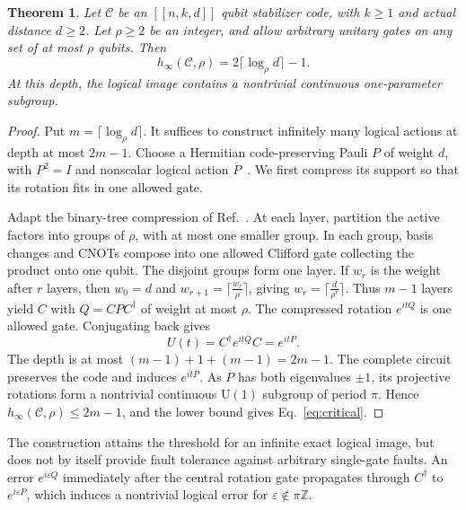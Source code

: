 \documentclass[aps,prl,reprint,notitlepage,nofootinbib,nobibnotes]{revtex4-2}
\newtheorem{theorem}{Theorem}
\newcommand{\id}{I}
\begin{document}
\begin{samepage}
\begin{theorem}\label{cor:critical}
Let \(\mathcal C\) be an \([[n,k,d]]\) qubit stabilizer code,
with \(k\ge1\) and actual distance \(d\ge2\). Let \(\rho\ge2\) be an
integer, and allow arbitrary unitary gates on any set of at most \(\rho\)
qubits. Then
\begin{equation}\label{eq:critical}
 h_\infty(\mathcal C,\rho)=2\lceil\log_{\rho} d\rceil-1.
\end{equation}
At this depth, the logical image contains a nontrivial continuous
one-parameter subgroup.
\end{theorem}
\end{samepage}

\begin{proof}
Put \(m=\lceil\log_\rho d\rceil\). It suffices to construct infinitely many
logical actions at depth at most \(2m-1\).
Choose a Hermitian code-preserving Pauli \(P\) of weight \(d\), with
\(P^2=\id\) and nonscalar logical action
\(\overline P\)~\cite[Sec.~3.2]{GottesmanStabilizer}.
We first compress its support so that its rotation fits in one allowed
gate.

Adapt the binary-tree compression of
Ref.~\cite[Sec.~IV and Fig.~2(a)]{BonetMonroig}.
At each layer, partition the active factors into groups of \(\rho\),
with at most one smaller group. In each group, basis changes and CNOTs
compose into one allowed Clifford gate collecting the product onto
one qubit. The disjoint groups form one layer.
If \(w_r\) is the weight after \(r\) layers, then
\(w_0=d\) and \(w_{r+1}=\lceil\frac{w_r}{\rho}\rceil\), giving
\(w_r=\lceil\frac{d}{\rho^r}\rceil\).
Thus \(m-1\) layers yield \(C\) with \(Q=CPC^\dagger\) of weight at
most \(\rho\). 
The compressed rotation \(e^{itQ}\) is one allowed gate.
Conjugating back gives
\begin{equation}\label{eq:pauli-family}
 U(t)=C^\dagger e^{itQ}C=e^{itP}.
\end{equation}
The depth is at most \((m-1)+1+(m-1)=2m-1\).
The complete circuit preserves the code and induces
\(e^{it\overline P}\). As \(\overline P\) has both eigenvalues
\(\pm1\), its projective rotations form a nontrivial continuous
\(\mathrm U(1)\) subgroup of period \(\pi\).
Hence \(h_\infty(\mathcal C,\rho)\le2m-1\), and the lower bound gives
Eq.~\eqref{eq:critical}.
\end{proof}
The construction attains the threshold for an infinite exact logical image,
but does not by itself provide fault tolerance against arbitrary single-gate faults.
An error \(e^{i\varepsilon Q}\) immediately after the central rotation gate
propagates through \(C^\dagger\) to \(e^{i\varepsilon P}\), which induces
a nontrivial logical error for \(\varepsilon\notin\pi\mathbb Z\).
\end{document}
